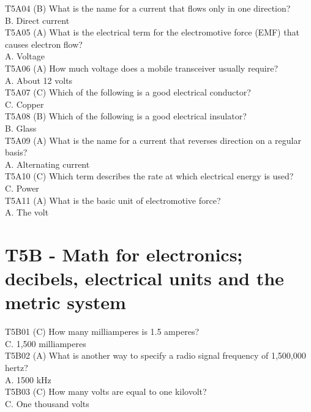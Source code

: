 \documentclass[12pt,letterpaper]{report}
\begin{document}
T5A04 (B) What is the name for a current that flows only in one direction?\\
B. Direct current\\

T5A05 (A) What is the electrical term for the electromotive force (EMF) that causes electron flow?\\
A. Voltage\\

T5A06 (A) How much voltage does a mobile transceiver usually require?\\
A. About 12 volts\\

T5A07 (C) Which of the following is a good electrical conductor?\\
C. Copper\\

T5A08 (B) Which of the following is a good electrical insulator?\\
B. Glass\\

T5A09 (A) What is the name for a current that reverses direction on a regular basis?\\
A. Alternating current\\

T5A10 (C) Which term describes the rate at which electrical energy is used?\\
C. Power\\

T5A11 (A) What is the basic unit of electromotive force?\\
A. The volt\\

\section{T5B - Math for electronics; decibels, electrical units and the metric system}

T5B01 (C) How many milliamperes is 1.5 amperes?\\
C. 1,500 milliamperes\\

T5B02 (A) What is another way to specify a radio signal frequency of 1,500,000 hertz?\\
A. 1500 kHz\\

T5B03 (C) How many volts are equal to one kilovolt?\\
C. One thousand volts\\
\end{document}
